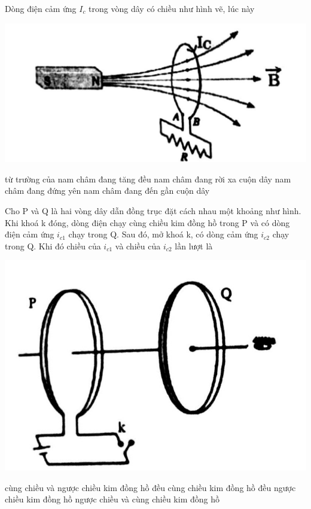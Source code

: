 \begin{ex}
	Dòng điện cảm ứng $I_c$ trong vòng dây có chiều như hình vẽ, lúc này
	\begin{center}
		\includegraphics[width=0.4\linewidth]{figs/VN12-Y24-PH-SYL-020P-22}
	\end{center}
	\choice
	{từ trường của nam châm đang tăng đều}
	{\True nam châm đang rời xa cuộn dây}
	{nam châm đang đứng yên}
	{nam châm đang đến gần cuộn dây}
\end{ex}
\begin{ex}
	Cho P và Q là hai vòng dây dẫn đồng trục đặt cách nhau một khoảng như hình. Khi khoá k đóng, dòng điện chạy cùng chiều kim đồng hồ trong P và có dòng điện cảm ứng $i_{c1}$ chạy trong Q. Sau đó, mở khoá k, có dòng cảm ứng $i_{c2}$ chạy trong Q. Khi đó chiều của $i_{c1}$ và chiều của $i_{c2}$ lần lượt là
	\begin{center}
		\includegraphics[width=0.3\linewidth]{figs/VN12-Y24-PH-SYL-020P-23}
	\end{center}
	\choice
	{cùng chiều và ngược chiều kim đồng hồ}
	{đều cùng chiều kim đồng hồ}
	{đều ngược chiều kim đồng hồ}
	{\True ngược chiều và cùng chiều kim đồng hồ}
	\loigiai{}
\end{ex}
